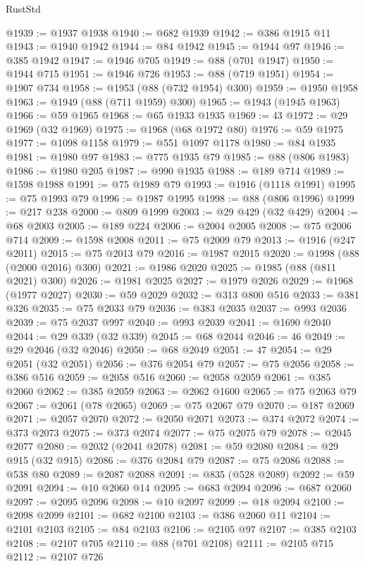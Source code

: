 \begin{lexlean}{RustStd}
\begin{coremodule}
@1939 := @1937 @1938
@1940 := @682 @1939
@1942 := @386 @1915 @11
@1943 := @1940 @1942
@1944 := @84 @1942
@1945 := @1944 @97
@1946 := @385 @1942
@1947 := @1946 @705
@1949 := @88 (@701 @1947)
@1950 := @1944 @715
@1951 := @1946 @726
@1953 := @88 (@719 @1951)
@1954 := @1907 @734
@1958 := @1953 (@88 (@732 @1954) @300)
@1959 := @1950 @1958
@1963 := @1949 (@88 (@711 @1959) @300)
@1965 := @1943 (@1945 @1963)
@1966 := @59 @1965
@1968 := @65 @1933 @1935
@1969 := 43
@1972 := @29 @1969 (@32 @1969)
@1975 := @1968 (@68 @1972 @80)
@1976 := @59 @1975
@1977 := @1098 @1158
@1979 := @551 @1097 @1178
@1980 := @84 @1935
@1981 := @1980 @97
@1983 := @775 @1935 @79
@1985 := @88 (@806 @1983)
@1986 := @1980 @205
@1987 := @990 @1935
@1988 := @189 @714
@1989 := @1598 @1988
@1991 := @75 @1989 @79
@1993 := @1916 (@1118 @1991)
@1995 := @75 @1993 @79
@1996 := @1987 @1995
@1998 := @88 (@806 @1996)
@1999 := @217 @238
@2000 := @809 @1999
@2003 := @29 @429 (@32 @429)
@2004 := @68 @2003
@2005 := @189 @224
@2006 := @2004 @2005
@2008 := @75 @2006 @714
@2009 := @1598 @2008
@2011 := @75 @2009 @79
@2013 := @1916 (@247 @2011)
@2015 := @75 @2013 @79
@2016 := @1987 @2015
@2020 := @1998 (@88 (@2000 @2016) @300)
@2021 := @1986 @2020
@2025 := @1985 (@88 (@811 @2021) @300)
@2026 := @1981 @2025
@2027 := @1979 @2026
@2029 := @1968 (@1977 @2027)
@2030 := @59 @2029
@2032 := @313 @800 @516
@2033 := @381 @326
@2035 := @75 @2033 @79
@2036 := @383 @2035
@2037 := @993 @2036
@2039 := @75 @2037 @997
@2040 := @993 @2039
@2041 := @1690 @2040
@2044 := @29 @339 (@32 @339)
@2045 := @68 @2044
@2046 := 46
@2049 := @29 @2046 (@32 @2046)
@2050 := @68 @2049
@2051 := 47
@2054 := @29 @2051 (@32 @2051)
@2056 := @376 @2054 @79
@2057 := @75 @2056
@2058 := @386 @516
@2059 := @2058 @516
@2060 := @2058 @2059
@2061 := @385 @2060
@2062 := @385 @2059
@2063 := @2062 @1600
@2065 := @75 @2063 @79
@2067 := @2061 (@78 @2065)
@2069 := @75 @2067 @79
@2070 := @187 @2069
@2071 := @2057 @2070
@2072 := @2050 @2071
@2073 := @374 @2072
@2074 := @373 @2073
@2075 := @373 @2074
@2077 := @75 @2075 @79
@2078 := @2045 @2077
@2080 := @2032 (@2041 @2078)
@2081 := @59 @2080
@2084 := @29 @915 (@32 @915)
@2086 := @376 @2084 @79
@2087 := @75 @2086
@2088 := @538 @80
@2089 := @2087 @2088
@2091 := @835 (@528 @2089)
@2092 := @59 @2091
@2094 := @10 @2060 @14
@2095 := @683 @2094
@2096 := @687 @2060
@2097 := @2095 @2096
@2098 := @10 @2097
@2099 := @18 @2094
@2100 := @2098 @2099
@2101 := @682 @2100
@2103 := @386 @2060 @11
@2104 := @2101 @2103
@2105 := @84 @2103
@2106 := @2105 @97
@2107 := @385 @2103
@2108 := @2107 @705
@2110 := @88 (@701 @2108)
@2111 := @2105 @715
@2112 := @2107 @726

\end{coremodule}
\end{lexlean}
